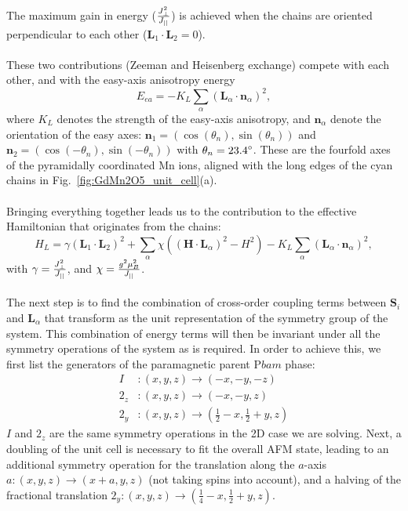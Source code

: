 The maximum gain in energy ($\frac{J_{\perp}^2}{J_{||}}$) is achieved when the chains are oriented perpendicular to each other ($\bm L_1 \cdot \bm L_2 = 0$).
\\\\
These two contributions (Zeeman and Heisenberg exchange) compete with each other, and with the easy-axis anisotropy energy
\begin{equation}
	E_{ea} = -K_L\sum_\alpha(\bm{L}_\alpha\cdot \bm{n}_\alpha)^2,
\end{equation}
where $K_L$ denotes the strength of the easy-axis anisotropy, and $\bm n_\alpha$ denote the orientation of the easy axes:
$\bm{n}_1=\left(\cos(\theta_n), \sin(\theta_n)\right)$ and $\bm{n}_2=\left(\cos(-\theta_n), \sin(-\theta_n)\right)$ with $\theta_n = \rm{23.4}^\circ$.
These are the fourfold axes of the pyramidally coordinated Mn ions, aligned with the long edges of the cyan chains in Fig.~\ref{fig:GdMn2O5_unit_cell}(a).
\\\\
Bringing everything together leads us to the contribution to the effective Hamiltonian that originates from the chains:
\begin{equation}
	H_L = \gamma(\bm{L}_1\cdot \bm{L}_2)^2
    +\sum_{\alpha}\chi((\bm{H}\cdot \bm{L}_\alpha)^2-H^2)
    -K_L\sum_\alpha(\bm{L}_\alpha\cdot \bm{n}_\alpha)^2\label{eq:GdMn2O5_hami_1},
\end{equation}
with $\gamma = \frac{J_{\perp}^2}{J_{||}}$, and $\chi = \frac{g^2\mu_B^2}{J_{||}}$. 
\\\\
The next step is to find the combination of cross-order coupling terms between $\bm S_i$ and $\bm L_\alpha$ that transform as the unit representation of the symmetry group of the system.
This combination of energy terms will then be invariant under all the symmetry operations of the system as is required.
In order to achieve this, we first list the generators of the paramagnetic parent P$bam$ phase:
\begin{align}
	I &: (x, y, z) \rightarrow (-x, -y, -z)\\
	2_z &: (x, y, z) \rightarrow (-x, -y, z)\\
	2_y &: (x, y, z) \rightarrow (\frac{1}{2} - x, \frac{1}{2} + y, z)
\end{align}
$I$ and $2_z$ are the same symmetry operations in the 2D case we are solving.
Next, a doubling of the unit cell is necessary to fit the overall AFM state, leading to an additional symmetry operation for the translation along the $a$-axis $a: (x, y, z) \rightarrow (x + a, y, z)$ (not taking spins into account), and a halving of the fractional translation $2_y: (x, y, z) \rightarrow (\frac{1}{4} - x, \frac{1}{2}+y, z)$.
